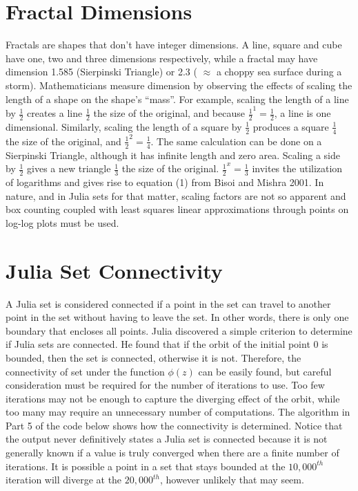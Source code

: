 \documentclass[letterpaper,11pt]{article}
\begin{document}
\section{Fractal Dimensions}
Fractals are shapes that don’t have integer dimensions. A line, square and cube have one, two and three dimensions respectively, while a fractal may have dimension 1.585 (Sierpinski Triangle) or 2.3 ( $\approx$ a choppy sea surface during a storm). Mathematicians measure dimension by observing the effects of scaling the length of a shape on the shape’s “mass”. For example, scaling the length of a line by $\frac{1}{2}$ creates a line $\frac{1}{2}$ the size of the original, and because $\frac{1}{2}^1=\frac{1}{2}$, a line is one dimensional. Similarly, scaling the length of a square by $\frac{1}{2}$ produces a square $\frac{1}{4}$ the size of the original, and $\frac{1}{2}^2 = \frac{1}{4}$. The same calculation can be done on a Sierpinski Triangle, although it has infinite length and zero area. Scaling a side by $\frac{1}{2}$ gives a new triangle $\frac{1}{3}$ the size of the original. $\frac{1}{2}^x = \frac{1}{3}$ invites the utilization of logarithms and gives rise to equation (1) from Bisoi and Mishra 2001. In nature, and in Julia sets for that matter, scaling factors are not so apparent and box counting coupled with least squares linear approximations through points on log-log plots must be used.

\section{Julia Set Connectivity}
A Julia set is considered connected if a point in the set can travel to another point in the set without having to leave the set. In other words, there is only one boundary that encloses all points. Julia discovered a simple criterion to determine if Julia sets are connected. He found that if the orbit of the initial point 0 is bounded, then the set is connected, otherwise it is not. Therefore, the connectivity of set under the function $\phi(z)$ can be easily found, but careful consideration must be required for the number of iterations to use. Too few iterations may not be enough to capture the diverging effect of the orbit, while too many may require an unnecessary number of computations. The algorithm in Part 5 of the code below shows how the connectivity is determined. Notice that the output never definitively states a Julia set is connected because it is not generally known if a value is truly converged when there are a finite number of iterations. It is possible a point in a set that stays bounded at the $10,000^{th}$ iteration will diverge at the $20,000^{th}$, however unlikely that may seem.
\end{document}
